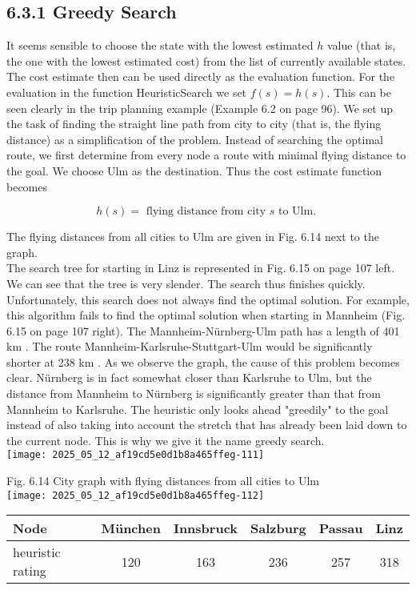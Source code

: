 \documentclass[10pt]{article}
\begin{document}
\subsection*{6.3.1 Greedy Search}
It seems sensible to choose the state with the lowest estimated $h$ value (that is, the one with the lowest estimated cost) from the list of currently available states. The cost estimate then can be used directly as the evaluation function. For the evaluation in the function HeuristicSearch we set $f(s)=h(s)$. This can be seen clearly in the trip planning example (Example 6.2 on page 96). We set up the task of finding the straight line path from city to city (that is, the flying distance) as a simplification of the problem. Instead of searching the optimal route, we first determine from every node a route with minimal flying distance to the goal. We choose Ulm as the destination. Thus the cost estimate function becomes

$$
h(s)=\text { flying distance from city } s \text { to Ulm. }
$$

The flying distances from all cities to Ulm are given in Fig. 6.14 next to the graph.\\
The search tree for starting in Linz is represented in Fig. 6.15 on page 107 left. We can
 see that the tree is very slender. The search thus finishes quickly. Unfortunately, this search does not always find the optimal solution. For example, this algorithm fails to find the optimal solution when starting in Mannheim (Fig. 6.15 on page 107 right). The Mannheim-Nürnberg-Ulm path has a length of 401 km . The route Mannheim-Karlsruhe-Stuttgart-Ulm would be significantly shorter at 238 km . As we observe the graph, the cause of this problem becomes clear. Nürnberg is in fact somewhat closer than Karlsruhe to Ulm, but the distance from Mannheim to Nürnberg is significantly greater than that from Mannheim to Karlsruhe. The heuristic only looks ahead "greedily" to the goal instead of also taking into account the stretch that has already been laid down to the current node. This is why we give it the name greedy search.\\
\texttt{[image: 2025\_05\_12\_af19cd5e0d1b8a465ffeg-111]}

Fig. 6.14 City graph with flying distances from all cities to Ulm\\
\texttt{[image: 2025\_05\_12\_af19cd5e0d1b8a465ffeg-112]}

\begin{center}
\begin{tabular}{|l||c|c|c|c|c|}
\hline
Node & München & Innsbruck & Salzburg & Passau & Linz \\
\hline
heuristic rating & 120 & 163 & 236 & 257 & 318 \\
\hline
\end{tabular}
\end{center}
\end{document}
